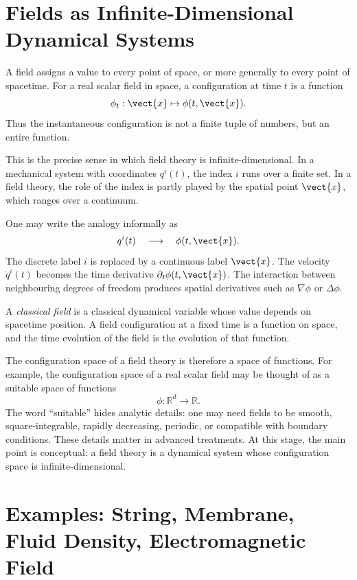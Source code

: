 \section{Fields as Infinite-Dimensional Dynamical Systems}

A field assigns a value to every point of space, or more generally to every
point of spacetime. For a real scalar field in space, a configuration at time
\(t\) is a function
\[
    \phi_t : \vect{x} \mapsto \phi(t,\vect{x}).
\]
Thus the instantaneous configuration is not a finite tuple of numbers, but an
entire function.

This is the precise sense in which field theory is infinite-dimensional. In a
mechanical system with coordinates \(q^i(t)\), the index \(i\) runs over a finite
set. In a field theory, the role of the index is partly played by the spatial
point \(\vect{x}\), which ranges over a continuum.

One may write the analogy informally as
\[
    q^i(t) \quad \longrightarrow \quad \phi(t,\vect{x}).
\]
The discrete label \(i\) is replaced by a continuous label \(\vect{x}\). The
velocity \(\dot q^i(t)\) becomes the time derivative \(\partial_t\phi(t,\vect{x})\).
The interaction between neighbouring degrees of freedom produces spatial
derivatives such as \(\nabla\phi\) or \(\Delta\phi\).

\begin{definitionbox}
A \emph{classical field} is a classical dynamical variable whose value depends
on spacetime position. A field configuration at a fixed time is a function on
space, and the time evolution of the field is the evolution of that function.
\end{definitionbox}

The configuration space of a field theory is therefore a space of functions. For
example, the configuration space of a real scalar field may be thought of as a
suitable space of functions
\[
    \phi : \mathbb{R}^d \to \mathbb{R}.
\]
The word ``suitable'' hides analytic details: one may need fields to be smooth,
square-integrable, rapidly decreasing, periodic, or compatible with boundary
conditions. These details matter in advanced treatments. At this stage, the
main point is conceptual: a field theory is a dynamical system whose
configuration space is infinite-dimensional.

\section{Examples: String, Membrane, Fluid Density, Electromagnetic Field}

